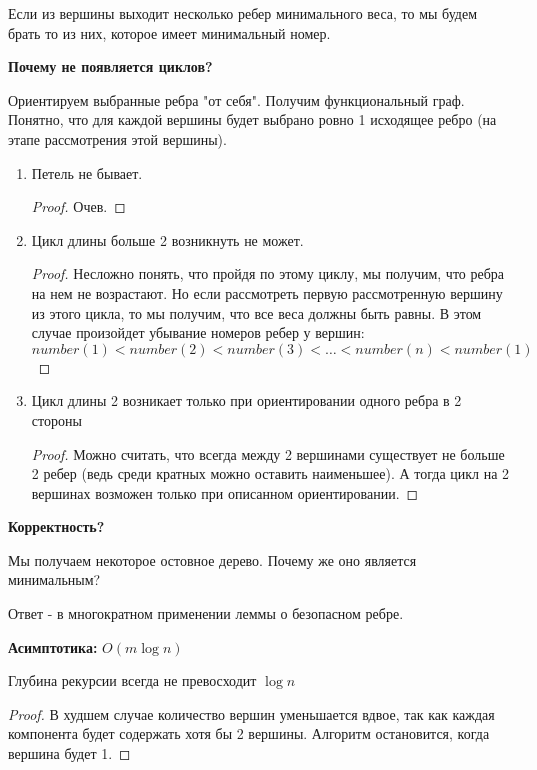 \begin{note}
  Если из вершины выходит несколько ребер минимального веса, то мы будем брать то из них, которое имеет минимальный номер.
\end{note}

\textbf{Почему не появляется циклов?}

Ориентируем выбранные ребра "от себя". Получим функциональный граф. Понятно, что для каждой вершины будет выбрано ровно 1 исходящее ребро (на этапе рассмотрения этой вершины).

\begin{enumerate}
  \item Петель не бывает.
\begin{proof}
  Очев.
\end{proof}
  \item Цикл длины больше 2 возникнуть не может. 
  \begin{proof}
    Несложно понять, что пройдя по этому циклу, мы получим, что ребра на нем не возрастают. Но если рассмотреть первую рассмотренную вершину из этого цикла, то мы получим, что все веса должны быть равны. В этом случае произойдет убывание номеров ребер у вершин:
    $$number(1) < number(2) < number(3) < \dots < number(n) < number(1)$$ 
  \end{proof}
  \item Цикл длины 2 возникает только при ориентировании одного ребра в 2 стороны
  \begin{proof}
    Можно считать, что всегда между 2 вершинами существует не больше 2 ребер (ведь среди кратных можно оставить наименьшее). А тогда цикл на 2 вершинах возможен только при описанном ориентировании.
  \end{proof}
\end{enumerate}

\textbf{Корректность?}

Мы получаем некоторое остовное дерево. Почему же оно является минимальным?

Ответ - в многократном применении леммы о безопасном ребре. 

\textbf{Асимптотика:} $O(m \log{n})$

\begin{proposition}
  Глубина рекурсии всегда не превосходит $\log{n}$
\end{proposition}
\begin{proof}
  В худшем случае количество вершин уменьшается вдвое, так как каждая компонента будет содержать хотя бы 2 вершины. Алгоритм остановится, когда вершина будет 1.
\end{proof}